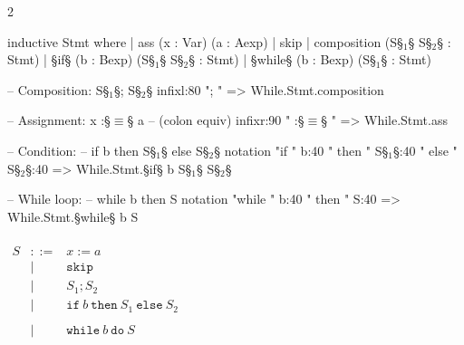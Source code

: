 \begin{paracol}{2}
\begin{leftcolumn}
    \begin{Lean_Code}
inductive Stmt where
  | ass  (x : Var)  (a : Aexp)
  | skip
  | composition (S§$_{1}$§ S§$_{2}$§ : Stmt)
  | §if§ (b : Bexp)
       (S§$_{1}$§ S§$_{2}$§ : Stmt)
  | §while§ (b : Bexp)
           (S§$_{1}$§ : Stmt)

-- Composition: S§\color{green!40!black}\(_1\)§; S§\color{green!40!black}\(_2\)§
infixl:80 "; " =>
    While.Stmt.composition

-- Assignment: x :§\color{green!40!black}\(\equiv\)§ a
-- (colon equiv)
infixr:90 " :§\color{purple}\(\equiv\)§ " =>
    While.Stmt.ass

-- Condition:
-- if b then S§\color{green!40!black}\(_1\)§ else S§\color{green!40!black}\(_2\)§
notation
    "if " b:40 " then "
    S§\(_1\)§:40 " else " S§\(_2\)§:40 =>
    While.Stmt.§if§ b S§\(_1\)§ S§\(_2\)§

-- While loop:
-- while b then S
notation
    "while " b:40 " then "
    S:40 =>
    While.Stmt.§while§ b S
    \end{Lean_Code}
\end{leftcolumn}
\begin{rightcolumn}
    \(\displaystyle
\begin{array}{lcl}
    \\[0.3em]
    S &::=& x := a \\
      &\mid& \mathtt{skip} \\
      &\mid& S_1; S_2 \\
      &\mid& \mathtt{if}\ b\ \mathtt{then}\ S_1\ \mathtt{else}\ S_2 \\
      \\
      &\mid& \mathtt{while}\ b\ \mathtt{do}\ S
\end{array}
    \)
\end{rightcolumn}
\end{paracol}
\vspace{1em}


